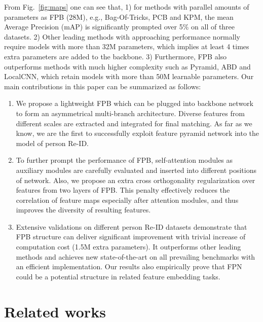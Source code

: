 \documentclass[journal]{IEEEtran}
\begin{document}
From Fig.~\ref{fig:maps} one can see that, 1) for methods with parallel amounts of parameters as FPB (28M), e.g., Bag-Of-Tricks, PCB and KPM, the mean Average Precision (mAP) is significantly prompted over 5\% on all of three datasets.
2) Other leading methods with approaching performance normally require models with more than 32M parameters, which implies at least 4 times extra parameters are added to the backbone.
3) Furthermore, FPB also outperforms methods with much higher complexity such as Pyramid, ABD and LocalCNN, which retain models with more than 50M learnable parameters.
Our main contributions in this paper can be summarized as follows:
\begin{enumerate}
  \item We propose a lightweight FPB which can be plugged into backbone network to form an asymmetrical multi-branch architecture.
  Diverse features from different scales are extracted and integrated for final matching.
  As far as we know, we are the first to successfully exploit feature pyramid network into the model of person Re-ID.
\item To further prompt the performance of FPB, self-attention modules as auxiliary modules are carefully evaluated and inserted into different positions of network.
  Also, we propose an extra cross orthogonality regularization over features from two layers of FPB.
  This penalty effectively reduces the correlation of feature maps especially after attention modules, and thus improves the diversity of resulting features.
  \item Extensive validations on different person Re-ID datasets demonstrate that FPB structure can deliver significant improvement with trivial increase of computation cost (1.5M extra parameters).
  It outperforms other leading methods and achieves new state-of-the-art on all prevailing benchmarks with an efficient implementation.
  Our results also empirically prove that FPN could be a potential structure in related feature embedding tasks.
\end{enumerate}

\section{Related works}\label{sec:related-works}
\end{document}
